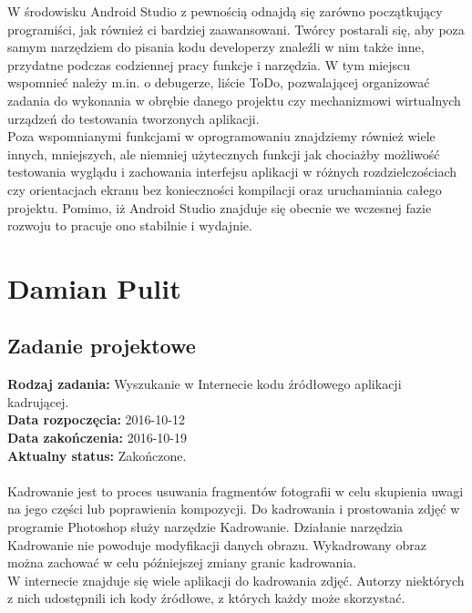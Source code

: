 W środowisku Android Studio z pewnością odnajdą się zarówno początkujący programiści, jak również ci bardziej zaawansowani. Twórcy postarali się, aby poza samym narzędziem do pisania kodu developerzy znaleźli w nim także inne, przydatne podczas codziennej pracy funkcje i narzędzia. W tym miejscu wspomnieć należy m.in. o debugerze, liście ToDo, pozwalającej organizować zadania do wykonania w obrębie danego projektu czy mechanizmowi wirtualnych urządzeń do testowania tworzonych aplikacji.\\

Poza wspomnianymi funkcjami w oprogramowaniu znajdziemy również wiele innych, mniejszych, ale niemniej użytecznych funkcji jak chociażby możliwość testowania wyglądu i zachowania interfejsu aplikacji w różnych rozdzielczościach czy orientacjach ekranu bez konieczności kompilacji oraz uruchamiania całego projektu. Pomimo, iż Android Studio znajduje się obecnie we wczesnej fazie rozwoju to pracuje ono stabilnie i wydajnie.
\newpage
\chapter {Damian Pulit}
\section{Zadanie projektowe}
\noindent\textbf{Rodzaj zadania:}  Wyszukanie w Internecie kodu źródłowego aplikacji kadrującej.\\

\noindent\textbf{Data rozpoczęcia:} 2016-10-12\\

\noindent\textbf{Data zakończenia:} 2016-10-19\\

\noindent\textbf{Aktualny status:} Zakończone.\\
\\

 Kadrowanie jest to proces usuwania fragmentów fotografii w celu skupienia uwagi na jego części lub poprawienia kompozycji. Do kadrowania i prostowania zdjęć w programie Photoshop służy narzędzie Kadrowanie. Działanie narzędzia Kadrowanie nie powoduje modyfikacji danych obrazu. Wykadrowany obraz można zachować w celu późniejszej zmiany granic kadrowania.\\

W internecie znajduje się wiele aplikacji do kadrowania zdjęć. Autorzy niektórych z nich udostępnili ich kody źródłowe, z których każdy może skorzystać.\\

